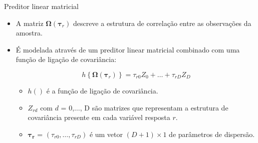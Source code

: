 \documentclass[
  ignorenonframetext,
  serif,
  professionalfont,
  usenames,
  dvipsnames,
  aspectratio = 169]{beamer}
\begin{document}
\begin{frame}{Preditor linear matricial}
\protect\hypertarget{preditor-linear-matricial}{}
\begin{itemize}
  
  \itemsep 2ex
  
  \item A matriz $\boldsymbol{\Omega}(\boldsymbol{\tau}_r)$ descreve a estrutura de correlação entre as observações da amostra.
  
  \item É modelada através de um preditor linear matricial combinado com uma função de ligação de covariância:

$$
h\left \{ \boldsymbol{\Omega}(\boldsymbol{\tau}_r) \right \} = \tau_{r0}Z_0 + \ldots + \tau_{rD}Z_D
$$
  
  \begin{itemize}
  
  \itemsep 2ex
  
  \item $h()$ é a função de ligação de covariância.
  
  \item $Z_{rd}$ com $d$ = 0,$\ldots$, D são matrizes que representam a estrutura de covariância presente em cada variável resposta $r$.
  
  \item $\boldsymbol{\tau_r}$ = $(\tau_{r0}, \ldots, \tau_{rD})$ é um vetor $(D + 1) \times 1$ de parâmetros de dispersão. 
  
\end{itemize}

\end{itemize}
\end{frame}
\end{document}

